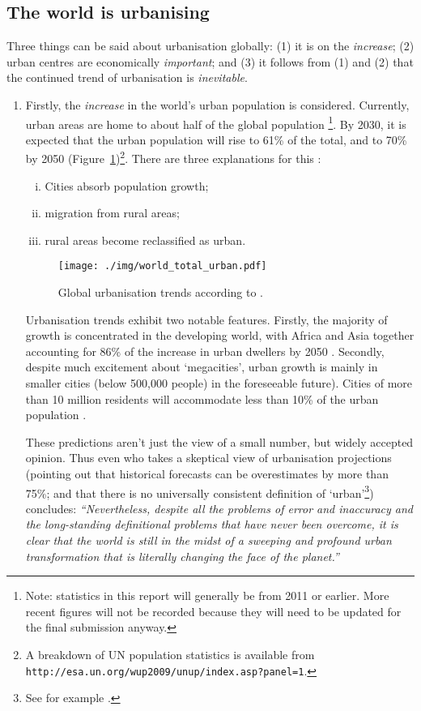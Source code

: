 \subsection{The world is urbanising}
Three things can be said about urbanisation globally: (1) it is on the \emph{increase}; (2) urban centres are economically \emph{important}; and (3) it follows from (1) and (2) that the continued trend of urbanisation is \emph{inevitable}. 
\begin{enumerate}
	\item Firstly, the \emph{increase} in the world's urban population is considered. Currently, urban areas are home to about half of the global population \citep{AREAS2012}\footnote{Note: statistics in this report will generally be from 2011 or earlier. More recent figures will not be recorded because they will need to be updated for the final submission anyway.}. By 2030, it is expected that the urban population will rise to 61\% of the total, and to 70\% by 2050 (Figure~\ref{fig:urban_trends})\footnote{A breakdown of UN population statistics is available from \texttt{http://esa.un.org/wup2009/unup/index.asp?panel=1}.}. There are three explanations for this \citep{Cohen2006}:
	\begin{enumerate}[(i)]
		\item Cities absorb population growth; 
		\item migration from rural areas;
		\item rural areas become reclassified as urban. 
	\end{enumerate}	

\begin{figure}[h]
	\centering
	\texttt{[image: ./img/world\_total\_urban.pdf]} 
	\caption{Global urbanisation trends according to \citet{AREAS2012}.} \label{fig:urban_trends}
\end{figure}

	Urbanisation trends exhibit two notable features. Firstly, the majority of growth is concentrated in the developing world, with Africa and Asia together accounting for 86\% of the increase in urban dwellers by 2050 \citep{York2011}. Secondly, despite much excitement about `megacities', urban growth is mainly in smaller cities (below 500,000 people) in the foreseeable future). Cities of more than 10 million residents will accommodate less than 10\% of the urban population \citep{Cohen2006}.

These predictions aren't just the view of a small number, but widely accepted opinion. Thus even \citet{Cohen2004} who takes a skeptical view of urbanisation projections (pointing out that historical forecasts can be overestimates by more than 75\%; and that there is no universally consistent definition of `urban'\footnote{See for example \citet{DepartmentforCommunitiesandLocalGovernment2006}.}) concludes: \emph{``Nevertheless, despite all the problems of error and inaccuracy and the long-standing definitional problems that have never been overcome, it is clear that the world is still in the midst of a sweeping and profound urban transformation that is literally changing the face of the planet.''}


\end{enumerate}
